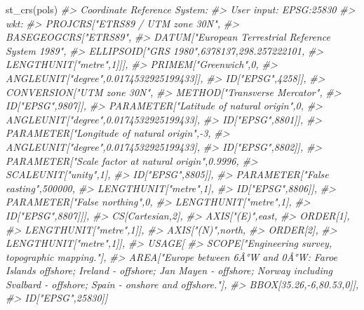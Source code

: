 \documentclass[
]{book}
\newenvironment{Shaded}{\begin{snugshade}}{\end{snugshade}}
\newcommand{\CommentTok}[1]{\textcolor[rgb]{0.56,0.35,0.01}{\textit{#1}}}
\newcommand{\FunctionTok}[1]{\textcolor[rgb]{0.00,0.00,0.00}{#1}}
\newcommand{\NormalTok}[1]{#1}
\theoremstyle{definition}
\theoremstyle{definition}
\theoremstyle{definition}
\theoremstyle{definition}
\theoremstyle{remark}
\begin{document}
\begin{Shaded}
\begin{Highlighting}[]
\FunctionTok{st\_crs}\NormalTok{(pols)}
\CommentTok{\#\textgreater{} Coordinate Reference System:}
\CommentTok{\#\textgreater{}   User input: EPSG:25830 }
\CommentTok{\#\textgreater{}   wkt:}
\CommentTok{\#\textgreater{} PROJCRS["ETRS89 / UTM zone 30N",}
\CommentTok{\#\textgreater{}     BASEGEOGCRS["ETRS89",}
\CommentTok{\#\textgreater{}         DATUM["European Terrestrial Reference System 1989",}
\CommentTok{\#\textgreater{}             ELLIPSOID["GRS 1980",6378137,298.257222101,}
\CommentTok{\#\textgreater{}                 LENGTHUNIT["metre",1]]],}
\CommentTok{\#\textgreater{}         PRIMEM["Greenwich",0,}
\CommentTok{\#\textgreater{}             ANGLEUNIT["degree",0.0174532925199433]],}
\CommentTok{\#\textgreater{}         ID["EPSG",4258]],}
\CommentTok{\#\textgreater{}     CONVERSION["UTM zone 30N",}
\CommentTok{\#\textgreater{}         METHOD["Transverse Mercator",}
\CommentTok{\#\textgreater{}             ID["EPSG",9807]],}
\CommentTok{\#\textgreater{}         PARAMETER["Latitude of natural origin",0,}
\CommentTok{\#\textgreater{}             ANGLEUNIT["degree",0.0174532925199433],}
\CommentTok{\#\textgreater{}             ID["EPSG",8801]],}
\CommentTok{\#\textgreater{}         PARAMETER["Longitude of natural origin",{-}3,}
\CommentTok{\#\textgreater{}             ANGLEUNIT["degree",0.0174532925199433],}
\CommentTok{\#\textgreater{}             ID["EPSG",8802]],}
\CommentTok{\#\textgreater{}         PARAMETER["Scale factor at natural origin",0.9996,}
\CommentTok{\#\textgreater{}             SCALEUNIT["unity",1],}
\CommentTok{\#\textgreater{}             ID["EPSG",8805]],}
\CommentTok{\#\textgreater{}         PARAMETER["False easting",500000,}
\CommentTok{\#\textgreater{}             LENGTHUNIT["metre",1],}
\CommentTok{\#\textgreater{}             ID["EPSG",8806]],}
\CommentTok{\#\textgreater{}         PARAMETER["False northing",0,}
\CommentTok{\#\textgreater{}             LENGTHUNIT["metre",1],}
\CommentTok{\#\textgreater{}             ID["EPSG",8807]]],}
\CommentTok{\#\textgreater{}     CS[Cartesian,2],}
\CommentTok{\#\textgreater{}         AXIS["(E)",east,}
\CommentTok{\#\textgreater{}             ORDER[1],}
\CommentTok{\#\textgreater{}             LENGTHUNIT["metre",1]],}
\CommentTok{\#\textgreater{}         AXIS["(N)",north,}
\CommentTok{\#\textgreater{}             ORDER[2],}
\CommentTok{\#\textgreater{}             LENGTHUNIT["metre",1]],}
\CommentTok{\#\textgreater{}     USAGE[}
\CommentTok{\#\textgreater{}         SCOPE["Engineering survey, topographic mapping."],}
\CommentTok{\#\textgreater{}         AREA["Europe between 6Â°W and 0Â°W: Faroe Islands offshore; Ireland {-} offshore; Jan Mayen {-} offshore; Norway including Svalbard {-} offshore; Spain {-} onshore and offshore."],}
\CommentTok{\#\textgreater{}         BBOX[35.26,{-}6,80.53,0]],}
\CommentTok{\#\textgreater{}     ID["EPSG",25830]]}
\end{Highlighting}
\end{Shaded}
\end{document}
